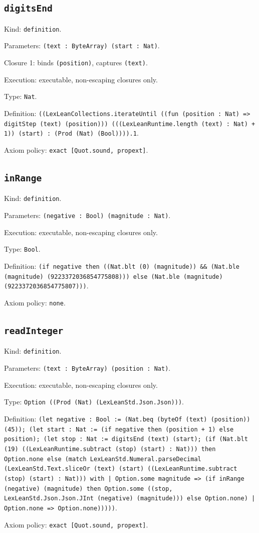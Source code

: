 \documentclass[11pt]{article}
\begin{document}
\subsection*{\texttt{digitsEnd}}
\noindent Kind: \texttt{definition}.\par
\noindent Parameters: \texttt{(text : ByteArray) (start : Nat)}.\par
\noindent Closure 1: binds \texttt{(position)}, captures \texttt{(text)}.\par
\noindent Execution: executable, non-escaping closures only.\par
\noindent Type: \texttt{Nat}.\par
\noindent Definition: \texttt{((LexLeanCollections.iterateUntil ((fun (position : Nat) => digitStep (text) (position))) (((LexLeanRuntime.length (text) : Nat) + 1)) (start) : (Prod (Nat) (Bool)))).1}.\par
\noindent Axiom policy: \texttt{exact [Quot.sound, propext]}.\par
\subsection*{\texttt{inRange}}
\noindent Kind: \texttt{definition}.\par
\noindent Parameters: \texttt{(negative : Bool) (magnitude : Nat)}.\par
\noindent Execution: executable, non-escaping closures only.\par
\noindent Type: \texttt{Bool}.\par
\noindent Definition: \texttt{(if negative then ((Nat.blt (0) (magnitude)) \&\& (Nat.ble (magnitude) (9223372036854775808))) else (Nat.ble (magnitude) (9223372036854775807)))}.\par
\noindent Axiom policy: \texttt{none}.\par
\subsection*{\texttt{readInteger}}
\noindent Kind: \texttt{definition}.\par
\noindent Parameters: \texttt{(text : ByteArray) (position : Nat)}.\par
\noindent Execution: executable, non-escaping closures only.\par
\noindent Type: \texttt{Option ((Prod (Nat) (LexLeanStd.Json.Json)))}.\par
\noindent Definition: \texttt{(let negative : Bool := (Nat.beq (byteOf (text) (position)) (45)); (let start : Nat := (if negative then (position + 1) else position); (let stop : Nat := digitsEnd (text) (start); (if (Nat.blt (19) ((LexLeanRuntime.subtract (stop) (start) : Nat))) then Option.none else (match LexLeanStd.Numeral.parseDecimal (LexLeanStd.Text.sliceOr (text) (start) ((LexLeanRuntime.subtract (stop) (start) : Nat))) with | Option.some magnitude => (if inRange (negative) (magnitude) then Option.some ((stop, LexLeanStd.Json.Json.JInt (negative) (magnitude))) else Option.none) | Option.none => Option.none)))))}.\par
\noindent Axiom policy: \texttt{exact [Quot.sound, propext]}.\par
\end{document}
